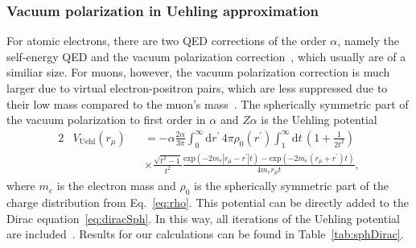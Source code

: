 \subsubsection{Vacuum polarization in Uehling approximation}
\label{sec:qed}

For atomic electrons, there are two QED corrections of the order $\alpha$, namely the self-energy QED and the vacuum polarization correction~\cite{Beier2000}, which usually are of a similiar size. For muons, however, the vacuum polarization correction is much larger due to virtual electron-positron pairs, which are less suppressed due to their low mass compared to the muon's mass~\cite{BorieRinker1982}. The spherically symmetric part of the vacuum polarization to first order in $\alpha$ and $Z\alpha$ is the Uehling potential~\cite{Elizarov2005}
\begin{alignat}{2}
&V_{\text{Uehl}}(r_\mu)&&=-\alpha \frac{2\alpha}{3\pi}\int_0^\infty \text{d}r^{\prime}\,4\pi \rho_0(r^\prime)\int_1^\infty \text{d}t\,\left( 1+\frac{1}{2t^2} \right)\nonumber\\[7.5pt]
&&&\times\frac{\sqrt{t^2-1}}{t^2} \frac{\text{exp}(-2m_e|r_\mu-r^\prime|t)-\text{exp}(-2m_e(r_\mu+r^\prime)t)}{4m_er_\mu t},
\label{eq:uehl_2}
\end{alignat}
where $m_e$ is the electron mass and $\rho_0$ is the spherically symmetric part of the charge distribution from Eq.~\eqref{eq:rho}. This potential can be directly added to the Dirac equation~\eqref{eq:diracSph}. In this way, all iterations of the Uehling potential are included~\cite{indelicato2013}. Results for our calculations can be found in Table~\ref{tab:sphDirac}.
%
%
